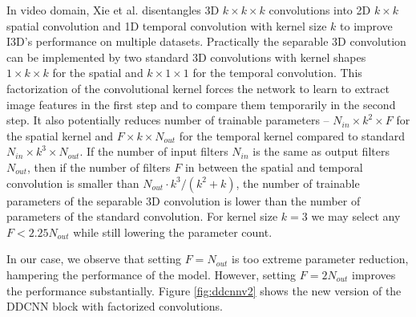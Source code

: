 In video domain, Xie et al. \cite{Xie_2018_ECCV} disentangles 3D $k \times k \times k$ convolutions into 2D $k\times k$ spatial convolution and 1D temporal convolution with kernel size $k$ to improve I3D's \cite{Carreira_2017_CVPR} performance on multiple datasets. Practically the separable 3D convolution can be implemented by two standard 3D convolutions with kernel shapes $1 \times k \times k$ for the spatial and $k \times 1 \times 1$ for the temporal convolution. This factorization of the convolutional kernel forces the network to learn to extract image features in the first step and to compare them temporarily in the second step. It also potentially reduces number of trainable parameters -- $N_{in}\times k^2\times F$ for the spatial kernel and $F\times k\times N_{out}$ for the temporal kernel compared to standard $N_{in}\times k^3\times N_{out}$. If the number of input filters $N_{in}$ is the same as output filters $N_{out}$, then if the number of filters $F$ in between the spatial and temporal convolution is smaller than $N_{out}\cdot k^3 / (k^2 + k)$, the number of trainable parameters of the separable 3D convolution is lower than the number of parameters of the standard convolution. For kernel size $k=3$ we may select any $F < 2.25 N_{out}$ while still lowering the parameter count.

In our case, we observe that setting $F=N_{out}$ is too extreme parameter reduction, hampering the performance of the model. However, setting $F=2 N_{out}$ improves the performance substantially. Figure \ref{fig:ddcnnv2} shows the new version of the DDCNN block with factorized convolutions.

